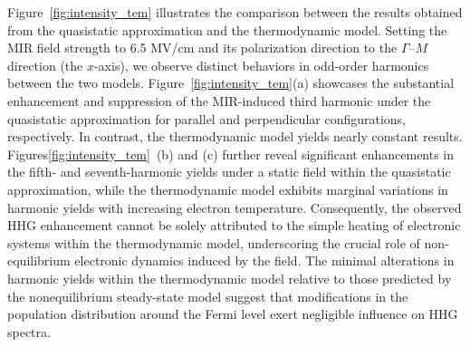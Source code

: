 Figure~\ref{fig:intensity_tem} illustrates the comparison between the results obtained from the quasistatic approximation and the thermodynamic model. Setting the MIR field strength to 6.5 MV/cm and its polarization direction to the $\Gamma$--$M$ direction (the $x$-axis), we observe distinct behaviors in odd-order harmonics between the two models. Figure~\ref{fig:intensity_tem}(a) showcases the substantial enhancement and suppression of the MIR-induced third harmonic under the quasistatic approximation for parallel and perpendicular configurations, respectively. In contrast, the thermodynamic model yields nearly constant results. Figures\ref{fig:intensity_tem}~(b) and (c) further reveal significant enhancements in the fifth- and seventh-harmonic yields under a static field within the quasistatic approximation, while the thermodynamic model exhibits marginal variations in harmonic yields with increasing electron temperature. Consequently, the observed HHG enhancement cannot be solely attributed to the simple heating of electronic systems within the thermodynamic model, underscoring the crucial role of non-equilibrium electronic dynamics induced by the field. The minimal alterations in harmonic yields within the thermodynamic model relative to those predicted by the nonequilibrium steady-state model suggest that modifications in the population distribution around the Fermi level exert negligible influence on HHG spectra.
